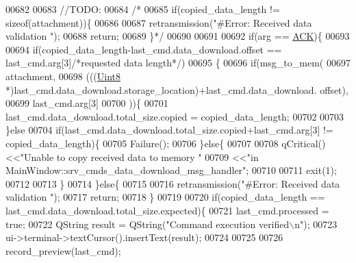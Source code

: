 \begin{DoxyCode}
{{{{{{{{{{{{{{{{{{{{00682 
00683             \textcolor{comment}{//TODO:}
00684            \textcolor{comment}{/*}
00685 \textcolor{comment}{           if(copied\_data\_length != sizeof(attachment))\{}
00686 \textcolor{comment}{}
00687 \textcolor{comment}{               retransmission("#Error: Received data  validation ");}
00688 \textcolor{comment}{               return;}
00689 \textcolor{comment}{           \}*/}
00690 
00691 
00692            \textcolor{keywordflow}{if}(arg == \hyperlink{a00034_a6f6489887e08bff4887d0bc5dcf214d8}{ACK})\{
00693 
00694                \textcolor{keywordflow}{if}(copied\_data\_length-last\_cmd.data\_download.offset == last\_cmd.arg[3]\textcolor{comment}{/*requested data
       length*/})
00695                \{
00696                \textcolor{keywordflow}{if}(msg\_to\_mem(
00697                       attachment,
00698                       (((\hyperlink{a00001_a979e3e23b9a449e69ab6a8a83b6042f8}{Uint8} *)last\_cmd.data\_download.storage\_location)+last\_cmd.data\_download.
      offset),
00699                       last\_cmd.arg[3]
00700                           ))\{
00701                    last\_cmd.data\_download.total\_size.copied = copied\_data\_length;
00702 
00703                   \}\textcolor{keywordflow}{else}
00704                   \textcolor{keywordflow}{if}(last\_cmd.data\_download.total\_size.copied+last\_cmd.arg[3] != copied\_data\_length)\{
00705                     Failure();
00706                   \}\textcolor{keywordflow}{else}\{
00707                    
00708                    qCritical() <<\textcolor{stringliteral}{"Unable to copy received data to memory "}
00709                                <<\textcolor{stringliteral}{"in MainWindow::srv\_cmds\_data\_download\_msg\_handler"};
00710                 
00711                    exit(1);
00712                    
00713                   \}
00714                \}\textcolor{keywordflow}{else}\{
00715                    
00716                   retransmission(\textcolor{stringliteral}{"#Error: Received data  validation "});
00717                   \textcolor{keywordflow}{return};
00718                \}
00719                
00720                \textcolor{keywordflow}{if}(copied\_data\_length == last\_cmd.data\_download.total\_size.expected)\{
00721                    last\_cmd.processed = \textcolor{keyword}{true};
00722                    QString result =  QString(\textcolor{stringliteral}{"Command execution verified\(\backslash\)n"});
00723                    ui->terminal->textCursor().insertText(result);
00724 
00725                    
00726                    record\_preview(last\_cmd);
}}}}}}}}}}}}}}}}}}}}
\end{DoxyCode}
